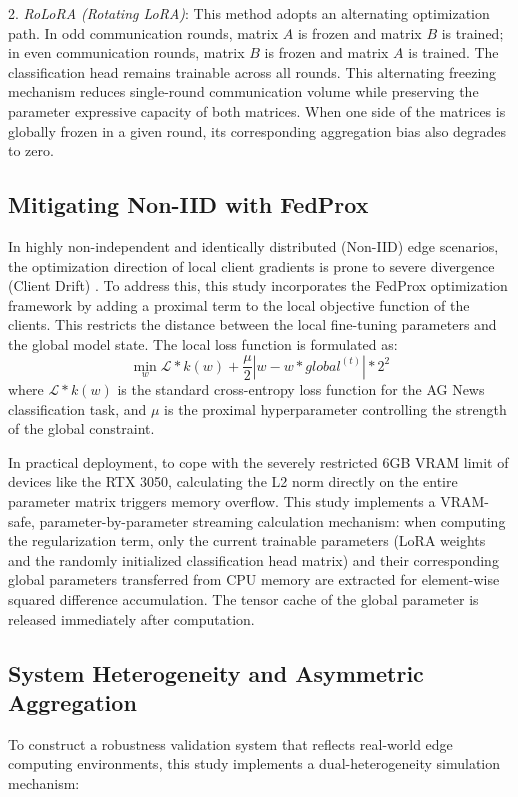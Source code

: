 2. \textit{RoLoRA (Rotating LoRA)}: This method adopts an alternating optimization path. In odd communication rounds, matrix $A$ is frozen and matrix $B$ is trained; in even communication rounds, matrix $B$ is frozen and matrix $A$ is trained. The classification head remains trainable across all rounds. This alternating freezing mechanism reduces single-round communication volume while preserving the parameter expressive capacity of both matrices. When one side of the matrices is globally frozen in a given round, its corresponding aggregation bias also degrades to zero.

\subsection{Mitigating Non-IID with FedProx}
In highly non-independent and identically distributed (Non-IID) edge scenarios, the optimization direction of local client gradients is prone to severe divergence (Client Drift) \cite{zhao2018federated}. To address this, this study incorporates the FedProx optimization framework \cite{li2020federated} by adding a proximal term to the local objective function of the clients. This restricts the distance between the local fine-tuning parameters and the global model state. The local loss function is formulated as:
\begin{equation}
\min_{w} \mathcal{L}*{k}(w) + \frac{\mu}{2} |w - w*{global}^{(t)}|*2^2
\end{equation}
where $\mathcal{L}*{k}(w)$ is the standard cross-entropy loss function for the AG News classification task, and $\mu$ is the proximal hyperparameter controlling the strength of the global constraint.

In practical deployment, to cope with the severely restricted 6GB VRAM limit of devices like the RTX 3050, calculating the L2 norm directly on the entire parameter matrix triggers memory overflow. This study implements a VRAM-safe, parameter-by-parameter streaming calculation mechanism: when computing the regularization term, only the current trainable parameters (LoRA weights and the randomly initialized classification head matrix) and their corresponding global parameters transferred from CPU memory are extracted for element-wise squared difference accumulation. The tensor cache of the global parameter is released immediately after computation.

\subsection{System Heterogeneity and Asymmetric Aggregation}
To construct a robustness validation system that reflects real-world edge computing environments, this study implements a dual-heterogeneity simulation mechanism:



